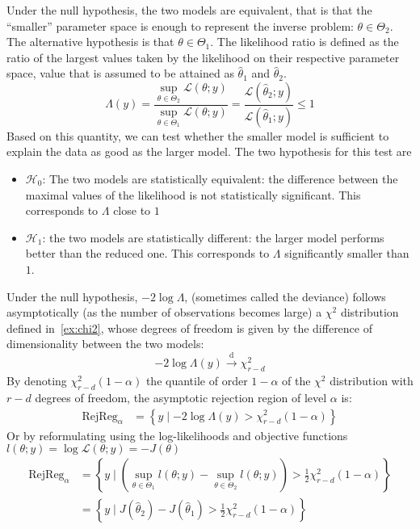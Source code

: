 \documentclass[../../Main_ManuscritThese.tex]{subfiles}
\begin{document}
Under the null hypothesis, the two models are equivalent, that is that the ``smaller'' parameter space is enough to represent the inverse problem: $\theta \in \Theta_2$. The alternative hypothesis is that $\theta \in \Theta_1$.
The likelihood ratio is defined as the ratio of the largest values taken by the likelihood on their respective parameter space, value that is assumed to be attained as $\hat{\theta}_1$ and $\hat{\theta}_2$.
\begin{equation}
  \label{eq:def_lik_ratio}
  \Lambda(y) = \frac{\sup_{\theta \in \Theta_2} \mathcal{L}(\theta ; y)}{\sup_{\theta \in \Theta_1} \mathcal{L}(\theta ; y)} = \frac{\mathcal{L}(\hat{\theta}_2 ; y)}{\mathcal{L}(\hat{\theta}_1 ; y)} \leq 1
\end{equation}
Based on this quantity, we can test whether the smaller model is sufficient to explain the data as good as the larger model. The two hypothesis for this test are
\begin{itemize}
\item $\mathcal{H}_0$: The two models are statistically equivalent: the difference between the maximal values of the likelihood is not statistically significant. This corresponds to $\Lambda$ close to $1$
\item  $\mathcal{H}_1$: the two models are statistically different: the larger model performs better than the reduced one. This corresponds to $\Lambda$ significantly smaller than $1$.
\end{itemize}
Under the null hypothesis, $-2 \log \Lambda$, (sometimes called the deviance) follows asymptotically (as the number of observations becomes large) a $\chi^2$ distribution defined in~\cref{ex:chi2}, whose degrees of freedom is given by the difference of dimensionality between the two models:
\begin{equation}
  \label{eq:deviance_asymptotics}
  - 2 \log \Lambda(y) \xrightarrow[]{\mathrm{d}} \chi^2_{r-d}
\end{equation}
By denoting $\chi^2_{r-d}(1-\alpha)$ the quantile of order $1-\alpha$ of the $\chi^2$ distribution with $r-d$ degrees of freedom, the asymptotic rejection region of level $\alpha$ is:
\begin{align}
  \mathrm{RejReg}_{\alpha} &= \left\{y \mid -2 \log \Lambda(y) > \chi^2_{r-d}(1-\alpha) \right\} \label{eq:LRT_rej_reg}
\end{align}
Or by reformulating using the log-likelihoods and objective functions $l(\theta;y) = \log \mathcal{L}(\theta;y) = - J(\theta)$
\begin{align}
  \mathrm{RejReg}_{\alpha} &= \left\{ y \mid (\sup_{\theta\in\Theta_1} l(\theta;y) - \sup_{\theta\in\Theta_2} l(\theta;y)) > \frac12 \chi^2_{r-d}(1-\alpha) \right\} \\
                             &= \left\{ y \mid J(\hat{\theta}_2) - J(\hat{\theta}_1) >  \frac12 \chi^2_{r-d}(1-\alpha) \right\}
\end{align}
\end{document}
